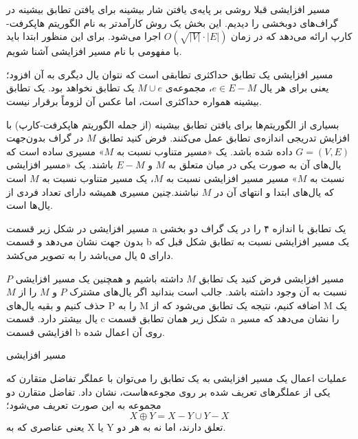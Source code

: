 \begin{itemframe}{مسیر افزایشی}
\itm
قبلا روشی بر پایه‌ی یافتن شار بیشینه برای یافتن تطابق بیشینه در گراف‌های دو‌بخشی را دیدیم.
\itm
این بخش یک روش کارآمدتر به نام الگوریتم هاپکرفت-کارپ
 ارائه می‌دهد که در زمان
 $O(\sqrt{|V|} \cdot |E|)$
 اجرا می‌شود.
\itm
برای این منظور ابتدا باید با مفهومی با نام مسیر افزایشی آشنا شویم.
\end{itemframe}


\begin{itemframe}{مسیر افزایشی}
\itm
یک تطابق حداکثری
 تطابقی است که نتوان یال دیگری به آن افزود؛ یعنی برای هر یال $e \in E - M$، مجموعه‌ی $M \cup {e}$ یک تطابق نخواهد بود. یک تطابق بیشینه همواره حداکثری است، اما عکس آن لزوماً برقرار نیست.

\itm
بسیاری از الگوریتم‌ها برای یافتن تطابق بیشینه (از جمله الگوریتم هاپکرفت-کارپ) با افزایش تدریجی اندازه‌ی تطابق عمل می‌کنند.
\itm
فرض کنید تطابق $M$ در گراف بدون‌جهت $G = (V, E)$ داده شده باشد. یک «مسیر متناوب نسبت به $M$»
مسیری ساده است که یال‌های آن به صورت یکی در میان متعلق به $M$ و $E - M$ باشند.
\itm
یک «مسیر افزایشی نسبت به $M$»
مسیر مسیر افزایشی نسبت به $M$، یک مسیر متناوب نسبت به $M$ است که یال‌های ابتدا و انتهای آن در $M$ نباشند.چنین مسیری همیشه دارای تعداد فردی از یال‌ها است.
\end{itemframe}


\begin{itemframe}{مسیر افزایشی}
\itm
در شکل زیر قسمت a یک تطابق با اندازه ۴ را در یک گراف دو بخشی بدون جهت نشان می‌دهد و قسمت b یک مسیر افزایشی نسبت به تطابق شکل قبل که دارای ۵ یال می‌باشد را به تصویر می‌کشد.

\end{itemframe}


\begin{itemframe}{مسیر افزایشی}
\decLineSpace[1mm]
\itm
فرض کنید یک تطابق $M$ داشته باشیم و همچنین یک مسیر افزایشی $P$ نسبت به آن وجود داشته باشد. جالب است بندانید اگر یال‌های مشترک $P$ و $M$ را از $M$ حذف کنیم و بقیه یال‌های P را به M اضافه کنیم، نتیجه یک تطابق می‌شود که از M یک یال بیشتر دارد.
\itm
قسمت c شکل زیر همان تطابق قسمت a را نشان می‌دهد که مسیر افزایشی قسمت b روی آن اعمال شده.

\end{itemframe}


\begin{itemframe}{مسیر افزایشی}

\itm
عملیات اعمال یک مسیر افزایشی به یک تطابق را می‌توان با عملگر تفاضل متقارن
 که یکی از عملگرهای تعریف شده بر روی مجوعه‌هاست، نشان داد.
\itm
تفاضل متقارن دو مجموعه به این صورت تعریف می‌شود؛
$$ X \oplus Y = X - Y \cup Y - X$$
یعنی عناصری که به X یا Y تعلق دارند، اما نه به هر دو.
\end{itemframe}


